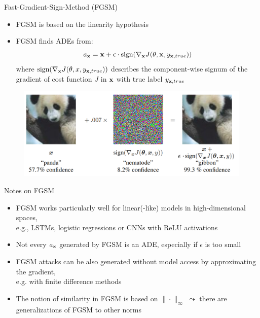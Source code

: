 \documentclass[11pt,compress,t,notes=noshow, aspectratio=169, xcolor=table]{beamer}
\begin{document}
\begin{vbframe}{Fast-Gradient-Sign-Method (FGSM)
}
\begin{itemize}
    \item FGSM is based on the linearity hypothesis
    \item FGSM finds ADEs from:
    \begin{equation*}
        a_{\xv}=\xv+\epsilon\cdot\text{sign}(\nabla_{\xv} J(\theta,\xv,y_{\xv,true}))
    \end{equation*}
    where $\text{sign}(\nabla_{\xv} J(\theta,x,y_{\xv,true}))$ describes the component-wise signum of the gradient of cost function $J$ in $\xv$ with true label $y_{\xv,true}$
\end{itemize}
\begin{figure}[h]
\centering
\includegraphics[width=0.7\linewidth]{figure/AEpanda.png}
  \label{fig:mnist}
\end{figure} 

\end{vbframe}

\begin{vbframe}[c]{Notes on FGSM  }
\begin{itemize}
    \item FGSM works particularly well for linear(-like) models in high-dimensional spaces,\\ e.g., LSTMs, logistic regressions or CNNs with ReLU activations
    \item Not every $a_{\xv}$ generated by FGSM is an ADE, especially if $\epsilon$ is too small
    \item FGSM attacks can be also generated without model access by approximating the gradient,\\ e.g. with finite difference methods
    \item The notion of similarity in FGSM is based on $\|\cdot\|_{\infty}$ $\leadsto$ there are generalizations of FGSM to other norms
\end{itemize}
\end{vbframe}
\end{document}
